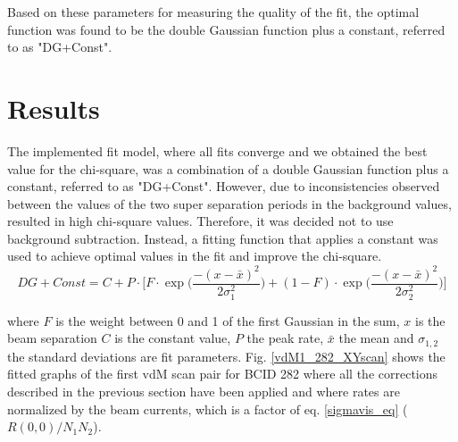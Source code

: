 Based on these parameters for measuring the quality of the fit,  the optimal function was found to be the  double Gaussian function plus a constant, referred to as "DG+Const".

\section{Results}

The implemented fit model, where all fits converge and we obtained the best value for the chi-square, was a combination of a double Gaussian function plus a constant, referred to as "DG+Const".
However, due to inconsistencies observed between the values of the two super separation periods in the background values, resulted in high chi-square values. Therefore, it was decided not to use background subtraction. Instead, a fitting function that applies a constant was used to achieve optimal values in the fit and improve the chi-square. %
\begin{equation}
DG+Const=
 C+P \cdot \Biggl[ F \cdot \exp \Biggl( \frac{-(x-\bar{x})^{2}}{2 \sigma_{1}^{2} } \Biggr) + (1-F) \cdot \exp \Biggl( \frac{-(x-\bar{x})^{2}}{2 \sigma_{2}^{2} } \Biggr) \Biggr] 
\end{equation}

where $F$ is the weight between 0 and 1 of the first Gaussian in the sum, $x$ is the beam separation $C$ is the constant value, $P$ the peak rate, $\bar{x}$ the mean and $\sigma_{1,2}$ the standard deviations are fit parameters. Fig. \ref{vdM1_282_XYscan} shows the fitted graphs of the first vdM scan pair for BCID 282 where  all the corrections described in the previous section have been applied and where  rates are normalized by the beam currents, which is a factor of eq. \ref{sigmavis_eq}  ($R(0,0)/N_{1}N_{2}$).

